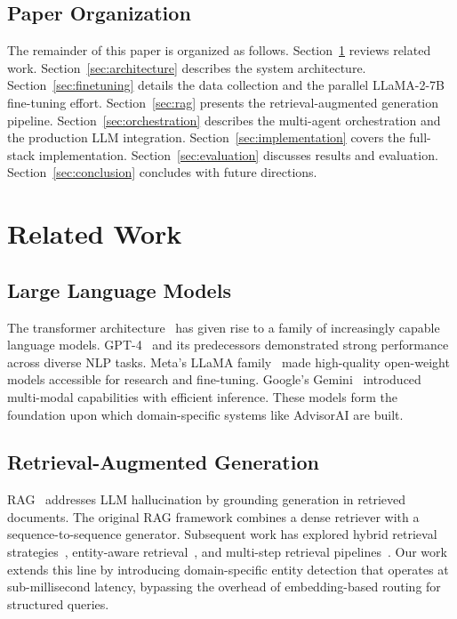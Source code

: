 \documentclass[conference,compsoc]{IEEEtran}
\begin{document}
\subsection{Paper Organization}

The remainder of this paper is organized as follows. Section~\ref{sec:related} reviews related work. Section~\ref{sec:architecture} describes the system architecture. Section~\ref{sec:finetuning} details the data collection and the parallel LLaMA-2-7B fine-tuning effort. Section~\ref{sec:rag} presents the retrieval-augmented generation pipeline. Section~\ref{sec:orchestration} describes the multi-agent orchestration and the production LLM integration. Section~\ref{sec:implementation} covers the full-stack implementation. Section~\ref{sec:evaluation} discusses results and evaluation. Section~\ref{sec:conclusion} concludes with future directions.

\section{Related Work}
\label{sec:related}

\subsection{Large Language Models}

The transformer architecture~\cite{vaswani2017attention} has given rise to a family of increasingly capable language models. GPT-4~\cite{openai2023gpt4} and its predecessors demonstrated strong performance across diverse NLP tasks. Meta's LLaMA family~\cite{touvron2023llama, touvron2023llama2} made high-quality open-weight models accessible for research and fine-tuning. Google's Gemini~\cite{google2023gemini} introduced multi-modal capabilities with efficient inference. These models form the foundation upon which domain-specific systems like AdvisorAI are built.

\subsection{Retrieval-Augmented Generation}

RAG~\cite{lewis2020rag} addresses LLM hallucination by grounding generation in retrieved documents. The original RAG framework combines a dense retriever with a sequence-to-sequence generator. Subsequent work has explored hybrid retrieval strategies~\cite{chen2020hybridqa}, entity-aware retrieval~\cite{petroni2019language}, and multi-step retrieval pipelines~\cite{izacard2021leveraging}. Our work extends this line by introducing domain-specific entity detection that operates at sub-millisecond latency, bypassing the overhead of embedding-based routing for structured queries.
\end{document}

